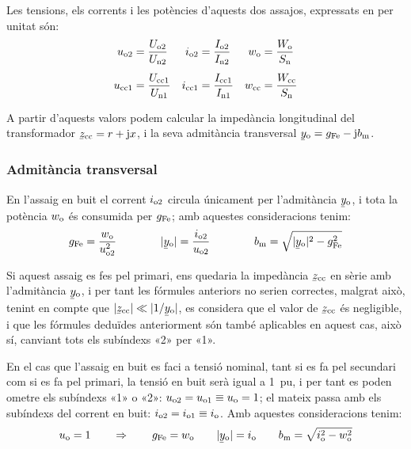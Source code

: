Les tensions, els corrents i les potències d'aquests dos  assajos,
expressats en per unitat són:
\begin{align}
    u_\mathrm{o2} &=\frac{U_\mathrm{o2}}{U_\mathrm{n2}} &
    i_\mathrm{o2} &=\frac{I_\mathrm{o2}}{I_\mathrm{n2}} &
    w_\mathrm{o}  &=\frac{W_\mathrm{o}}{S_\mathrm{n}} \\[1ex]
    u_\mathrm{cc1} &=\frac{U_\mathrm{cc1}}{U_\mathrm{n1}} &
    i_\mathrm{cc1} &=\frac{I_\mathrm{cc1}}{I_\mathrm{n1}} &
    w_\mathrm{cc} &=\frac{W_\mathrm{cc}}{S_\mathrm{n}}
\end{align}

A partir d'aquests valors podem calcular la impedància longitudinal
del transformador $\cmplx{z}\ped{cc}=r+\ju x$, i la seva admitància
transversal $\cmplx{y}\ped{o}=g\ped{Fe}-\ju b\ped{m}$.

\subsubsection{Admitància transversal}

En l'assaig en buit el corrent $i_\mathrm{o2}$ circula
únicament per l'admitància $\cmplx{y}\ped{o}$, i tota la potència
$w_\mathrm{o}$ és consumida per $g_\mathrm{Fe}$; amb aquestes consideracions
tenim:
\begin{equation}
    g\ped{Fe} = \frac{w\ped{o}}{u\ped{o2}^2} \qquad\qquad
    |\cmplx{y}\ped{o}| = \frac{i\ped{o2}}{u\ped{o2}}
    \qquad\qquad
    b\ped{m} = \sqrt{|\cmplx{y}\ped{o}|^2 - g\ped{Fe}^2}
\end{equation}

Si aquest assaig es fes pel primari, ens quedaria la impedància
$\cmplx{z}\ped{cc}$ en sèrie amb l'admitància $\cmplx{y}\ped{o}$, i
per tant les fórmules anteriors no serien correctes, malgrat això,
tenint en compte que $|\cmplx{z}\ped{cc}| \ll |1/\cmplx{y}\ped{o}|$,
es  considera que el valor de $\cmplx{z}\ped{cc}$ és negligible, i
que les fórmules deduïdes anteriorment són també aplicables en
aquest cas, això sí, canviant tots els subíndexs «2» per «1».

En el cas que l'assaig en buit es faci a tensió nominal, tant  si es
fa pel secundari com si es fa pel primari, la tensió en buit serà
igual a \SI{1}{pu}, i per tant es poden ometre els subíndexs «1» o «2»:
$u_\mathrm{o2} = u_\mathrm{o1} \equiv u_\mathrm{o} = 1$; el mateix passa amb els
subíndexs del corrent en buit: $i_\mathrm{o2} = i_\mathrm{o1} \equiv
i_\mathrm{o}$. Amb aquestes consideracions tenim:
\begin{equation}
    u\ped{o} = 1 \qquad \Rightarrow \qquad g\ped{Fe} = w\ped{o} \qquad
    |\cmplx{y}\ped{o}| = i\ped{o} \qquad
    b\ped{m} = \sqrt{i\ped{o}^2 - w\ped{o}^2}
    \label{eq:assaig-buit-nomianl}
\end{equation}

